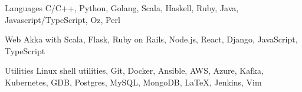 

\begin{cvskills}


  \cvskill
  {Languages}
  {C/C++, Python, Golang, Scala, Haskell, Ruby, Java, Javascript/TypeScript, Oz, Perl}


  \cvskill
  {Web}
  {Akka with Scala, Flask, Ruby on Rails, Node.js, React, Django, JavaScript, TypeScript}


  \cvskill
  {Utilities}
  {Linux shell utilities, Git, Docker, Ansible, AWS, Azure, Kafka, Kubernetes, GDB, Postgres, MySQL, MongoDB, \LaTeX, Jenkins, Vim}




\end{cvskills}
